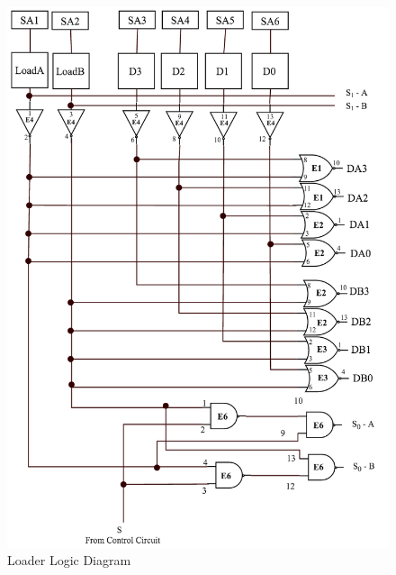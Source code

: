 \documentclass[journal, twocolumn, final,11pt,letterpaper]{IEEEtran}
\begin{document}
\begin{figure} [H]
	\centering
	\includegraphics[scale=0.6]{Loader_Logic.png}
	\caption{Loader Logic Diagram\label{fig:loader-logic-diagram}}
\end{figure}
\end{document}
